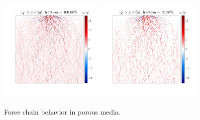 \begin{figure}[H]
  \centering
  \includegraphics[width=0.45\textwidth]{./Figs/flowchain1}
  \includegraphics[width=0.45\textwidth]{./Figs/flowchain2}
  \caption{Force chain behavior in porous media.} \label{flow-chain}
\end{figure}







